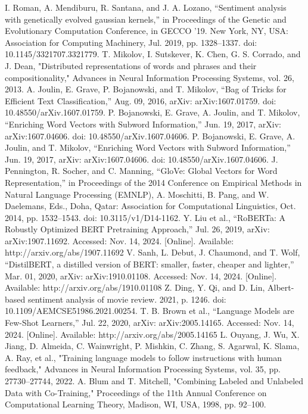 \documentclass{article}
\begin{document}
\begin{thebibliography}{99}
I. Roman, A. Mendiburu, R. Santana, and J. A. Lozano, “Sentiment analysis with genetically evolved gaussian kernels,” in Proceedings of the Genetic and Evolutionary Computation Conference, in GECCO ’19. New York, NY, USA: Association for Computing Machinery, Jul. 2019, pp. 1328–1337. doi: 10.1145/3321707.3321779.
T. Mikolov, I. Sutskever, K. Chen, G. S. Corrado, and J. Dean, "Distributed representations of words and phrases and their compositionality," Advances in Neural Information Processing Systems, vol. 26, 2013.
A. Joulin, E. Grave, P. Bojanowski, and T. Mikolov, “Bag of Tricks for Efficient Text Classification,” Aug. 09, 2016, arXiv: arXiv:1607.01759. doi: 10.48550/arXiv.1607.01759.
P. Bojanowski, E. Grave, A. Joulin, and T. Mikolov, “Enriching Word Vectors with Subword Information,” Jun. 19, 2017, arXiv: arXiv:1607.04606. doi: 10.48550/arXiv.1607.04606.
P. Bojanowski, E. Grave, A. Joulin, and T. Mikolov, “Enriching Word Vectors with Subword Information,” Jun. 19, 2017, arXiv: arXiv:1607.04606. doi: 10.48550/arXiv.1607.04606.
J. Pennington, R. Socher, and C. Manning, “GloVe: Global Vectors for Word Representation,” in Proceedings of the 2014 Conference on Empirical Methods in Natural Language Processing (EMNLP), A. Moschitti, B. Pang, and W. Daelemans, Eds., Doha, Qatar: Association for Computational Linguistics, Oct. 2014, pp. 1532–1543. doi: 10.3115/v1/D14-1162.
Y. Liu et al., “RoBERTa: A Robustly Optimized BERT Pretraining Approach,” Jul. 26, 2019, arXiv: arXiv:1907.11692. Accessed: Nov. 14, 2024. [Online]. Available: http://arxiv.org/abs/1907.11692
V. Sanh, L. Debut, J. Chaumond, and T. Wolf, “DistilBERT, a distilled version of BERT: smaller, faster, cheaper and lighter,” Mar. 01, 2020, arXiv: arXiv:1910.01108. Accessed: Nov. 14, 2024. [Online]. Available: http://arxiv.org/abs/1910.01108
Z. Ding, Y. Qi, and D. Lin, Albert-based sentiment analysis of movie review. 2021, p. 1246. doi: 10.1109/AEMCSE51986.2021.00254.
T. B. Brown et al., “Language Models are Few-Shot Learners,” Jul. 22, 2020, arXiv: arXiv:2005.14165. Accessed: Nov. 14, 2024. [Online]. Available: http://arxiv.org/abs/2005.14165
L. Ouyang, J. Wu, X. Jiang, D. Almeida, C. Wainwright, P. Mishkin, C. Zhang, S. Agarwal, K. Slama, A. Ray, et al., "Training language models to follow instructions with human feedback," Advances in Neural Information Processing Systems, vol. 35, pp. 27730–27744, 2022.
A. Blum and T. Mitchell, "Combining Labeled and Unlabeled Data with Co-Training," Proceedings of the 11th Annual Conference on Computational Learning Theory, Madison, WI, USA, 1998, pp. 92–100.


\end{thebibliography}
\end{document}
